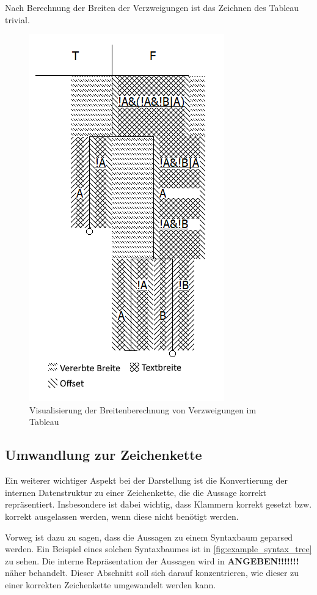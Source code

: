 Nach Berechnung der Breiten der Verzweigungen ist das Zeichnen des Tableau trivial.

\begin{figure}[H]
\begin{center}
\includegraphics[scale=1]{images/drawing_logic_calc_widths.png}
\caption{Visualisierung der Breitenberechnung von Verzweigungen im Tableau}
\label{fig:drawing_logic_calc_widths}
\end{center}
\end{figure}

\subsection{Umwandlung zur Zeichenkette}
Ein weiterer wichtiger Aspekt bei der Darstellung ist die Konvertierung der internen Datenstruktur zu einer Zeichenkette, die die Aussage korrekt repräsentiert. Insbesondere ist dabei wichtig, dass Klammern korrekt gesetzt bzw. korrekt ausgelassen werden, wenn diese nicht benötigt werden.

Vorweg ist dazu zu sagen, dass die Aussagen zu einem Syntaxbaum geparsed werden. Ein Beispiel eines solchen Syntaxbaumes ist in \autoref{fig:example_syntax_tree} zu sehen. Die interne Repräsentation der Aussagen wird in \textbf{ANGEBEN!!!!!!!} näher behandelt. Dieser Abschnitt soll sich darauf konzentrieren, wie dieser zu einer korrekten Zeichenkette umgewandelt werden kann.

